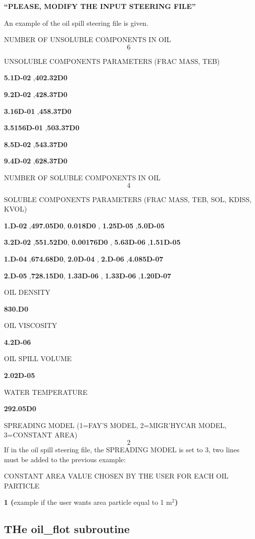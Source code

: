  \textbf{``PLEASE, MODIFY THE INPUT STEERING FILE''}

 An example of the oil spill steering file is given.

NUMBER OF UNSOLUBLE COMPONENTS IN OIL
\[6\]

UNSOLUBLE COMPONENTS PARAMETERS (FRAC MASS, TEB)

\textbf{5.1D-02}    ,\textbf{402.32D0}

\textbf{9.2D-02}    ,\textbf{428.37D0}

\textbf{3.16D-01}   ,\textbf{458.37D0}

\textbf{3.5156D-01}    ,\textbf{503.37D0}

\textbf{8.5D-02}       ,\textbf{543.37D0}

\textbf{9.4D-02}       ,\textbf{628.37D0}

NUMBER OF SOLUBLE COMPONENTS IN OIL
\[4\]

SOLUBLE COMPONENTS PARAMETERS (FRAC MASS, TEB, SOL, KDISS, KVOL)

\textbf{1.D-02}   ,\textbf{497.05D0},  \textbf{0.018D0}   , \textbf{1.25D-05} ,\textbf{5.0D-05}

\textbf{3.2D-02}  ,\textbf{551.52D0},  \textbf{0.00176D0} , \textbf{5.63D-06} ,\textbf{1.51D-05}

\textbf{1.D-04}   ,\textbf{674.68D0},  \textbf{2.0D-04}   , \textbf{2.D-06}   ,\textbf{4.085D-07}

\textbf{2.D-05}   ,\textbf{728.15D0},  \textbf{1.33D-06}  , \textbf{1.33D-06} ,\textbf{1.20D-07}

OIL DENSITY

\textbf{830.D0}

OIL VISCOSITY

\textbf{4.2D-06}

OIL SPILL VOLUME

\textbf{2.02D-05}

WATER TEMPERATURE

\textbf{292.05D0}

SPREADING MODEL (1=FAY'S MODEL, 2=MIGR'HYCAR MODEL, 3=CONSTANT AREA)
\[2\]
If in the oil spill steering file, the SPREADING MODEL is set to 3, two lines must be added to the previous example:

CONSTANT AREA VALUE CHOSEN BY THE USER FOR EACH OIL PARTICLE

\textbf{1 (}example if the user wants area particle equal to 1 m${}^{2}$\textbf{)}


\subsection{ THe oil\_flot subroutine}

